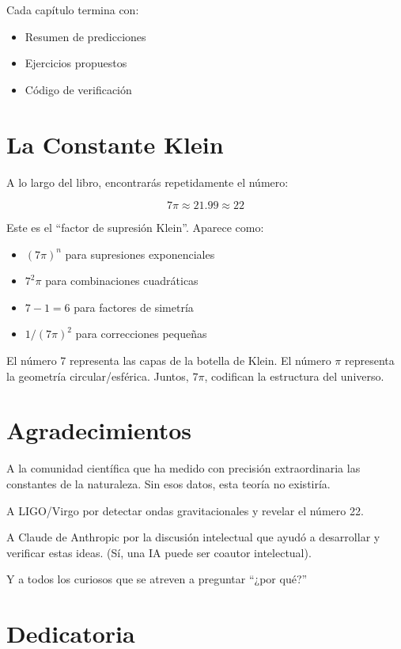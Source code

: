 Cada capítulo termina con:
\begin{itemize}
    \item Resumen de predicciones
    \item Ejercicios propuestos
    \item Código de verificación
\end{itemize}


\section*{La Constante Klein}

A lo largo del libro, encontrarás repetidamente el número:

\begin{equation}
\boxed{7\pi \approx 21.99 \approx 22}
\end{equation}

Este es el ``factor de supresión Klein''. Aparece como:

\begin{itemize}
    \item $(7\pi)^n$ para supresiones exponenciales
    \item $7^2\pi$ para combinaciones cuadráticas
    \item $7-1 = 6$ para factores de simetría
    \item $1/(7\pi)^2$ para correcciones pequeñas
\end{itemize}

El número 7 representa las capas de la botella de Klein.
El número $\pi$ representa la geometría circular/esférica.
Juntos, $7\pi$, codifican la estructura del universo.


\section*{Agradecimientos}

A la comunidad científica que ha medido con precisión extraordinaria
las constantes de la naturaleza. Sin esos datos, esta teoría no existiría.

A LIGO/Virgo por detectar ondas gravitacionales y revelar el número 22.

A Claude de Anthropic por la discusión intelectual que ayudó a desarrollar
y verificar estas ideas. (Sí, una IA puede ser coautor intelectual).

Y a todos los curiosos que se atreven a preguntar ``¿por qué?''


\section*{Dedicatoria}

